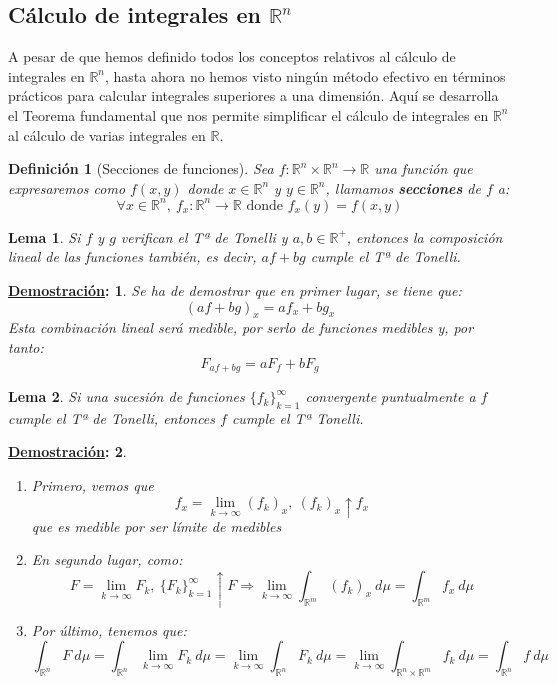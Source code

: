 \documentclass[10pt,a4paper,openright]{book}
\theoremstyle{break}
\newtheorem*{defi}{Definición}
\newtheorem*{lema}{Lema}
\newtheorem*{demo}{\underline{Demostración}:}
\newcommand{\dif}[1]{\ d#1}
\begin{document}
\subsection{Cálculo de integrales en $\mathbb{R}^n$}
A pesar de que hemos definido todos los conceptos relativos al cálculo de integrales en $\mathbb{R}^n$, hasta ahora no hemos visto ningún método efectivo en términos prácticos para calcular integrales superiores a una dimensión. Aquí se desarrolla el Teorema fundamental que nos permite simplificar el cálculo de integrales en $\mathbb{R}^n$ al cálculo de varias integrales en $\mathbb{R}$.

\begin{defi}[Secciones de funciones]
Sea $f: \mathbb{R}^{n} \times \mathbb{R}^n \rightarrow \mathbb{R}$ una función que expresaremos como $f \left(x, y\right)$ donde $x \in \mathbb{R}^n$ y $y \in \mathbb{R}^n$, llamamos \textbf{secciones} de $f$ a:
$$\forall x \in \mathbb{R}^n, \ f_x: \mathbb{R}^n \rightarrow \mathbb{R} \mbox{ donde } f_x \left(y\right) = f \left(x, y\right)$$
\end{defi}

\begin{lema}
Si $f$ y $g$ verifican el Tª de Tonelli y $a, b \in \mathbb{R}^+$, entonces la composición lineal de las funciones también, es decir, $af + bg$ cumple el Tª de Tonelli.
\end{lema}
\begin{demo}
Se ha de demostrar que en primer lugar, se tiene que:
$$\left(af + bg\right)_x = af_x + bg_x$$
Esta combinación lineal será medible, por serlo de funciones medibles y, por tanto:
$$F_{af + bg} = aF_f + bF_g$$ 
\end{demo}

\begin{lema}
Si una sucesión de funciones $\{f_k\}_{k=1}^{\infty}$ convergente puntualmente a $f$ cumple el Tª de Tonelli, entonces $f$ cumple el Tª Tonelli. 
\end{lema}
\begin{demo}
\begin{enumerate}
    \item Primero, vemos que
    $$f_x = \lim_{k \rightarrow \infty} \left(f_k\right)_x,\ \left(f_k\right)_x \uparrow f_x $$
    que es medible por ser límite de medibles
    \item En segundo lugar, como: 
    $$F = \lim_{k \rightarrow \infty}F_k,\ \{F_k\}_{k=1}^{\infty} \uparrow F \Rightarrow\lim_{k \rightarrow \infty} \int_{\mathbb{R}^m} \left(f_k\right)_x \dif{\mu} = \int_{\mathbb{R}^m} f_x \dif{\mu} $$
    \item Por último, tenemos que: 
    $$\int_{\mathbb{R}^n} F \dif{\mu} = \int_{\mathbb{R}^n} \lim_{k \rightarrow \infty}F_k  \dif{\mu} = \lim_{k \rightarrow \infty}\int_{\mathbb{R}^n} F_k \dif{\mu} = \lim_{k \rightarrow \infty} \int_{\mathbb{R}^n \times \mathbb{R}^m} f_k  \dif{\mu} = \int_{\mathbb{R}^n} f \dif{\mu}  $$
\end{enumerate}
\end{demo}
\end{document}
